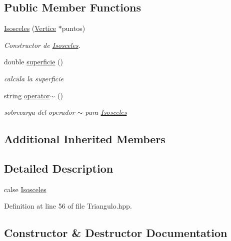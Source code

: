 \subsection*{Public Member Functions}
\begin{DoxyCompactItemize}
\item 
\hyperlink{class_isosceles_a5dc812e7ac02a71016cdc2175176608a}{Isosceles} (\hyperlink{class_vertice}{Vertice} $\ast$puntos)
\begin{DoxyCompactList}\small\item\em Constructor de \hyperlink{class_isosceles}{Isosceles}. \end{DoxyCompactList}\item 
\mbox{\label{class_isosceles_aa09c863c5ef3620e9c57b09ee380d3d1}} 
double \hyperlink{class_isosceles_aa09c863c5ef3620e9c57b09ee380d3d1}{superficie} ()
\begin{DoxyCompactList}\small\item\em calcula la superficie \end{DoxyCompactList}\item 
\mbox{\label{class_isosceles_a8998981f4d303e909964dfe90f77f445}} 
string \hyperlink{class_isosceles_a8998981f4d303e909964dfe90f77f445}{operator$\sim$} ()
\begin{DoxyCompactList}\small\item\em sobrecarga del operador $\sim$ para \hyperlink{class_isosceles}{Isosceles} \end{DoxyCompactList}\end{DoxyCompactItemize}
\subsection*{Additional Inherited Members}


\subsection{Detailed Description}
calse \hyperlink{class_isosceles}{Isosceles} 

Definition at line 56 of file Triangulo.\+hpp.



\subsection{Constructor \& Destructor Documentation}
\mbox{\label{class_isosceles_a5dc812e7ac02a71016cdc2175176608a}} 
